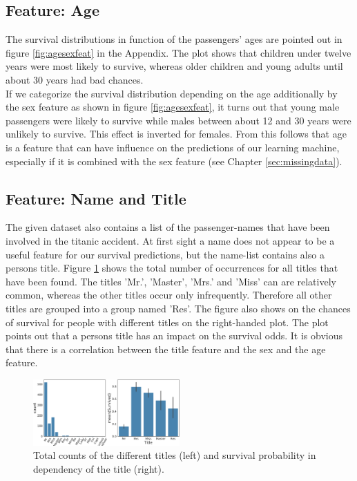 \subsection*{Feature: Age}
The survival distributions in function of the passengers' ages are pointed out in figure \ref{fig:agesexfeat} in the Appendix. The plot shows that children under twelve years were most likely to survive, whereas older children and young adults until about 30 years had bad chances.\\ 
If we categorize the survival distribution depending on the age additionally by the sex feature as shown in figure \ref{fig:agesexfeat}, it turns out that young male passengers were likely to survive while males between about 12 and 30 years were unlikely to survive. This effect is inverted for females. From this follows that age is a feature that can have influence on the predictions of our learning machine, especially if it is combined with the sex feature (see Chapter \ref{sec:missingdata}).


 
 \subsection*{Feature: Name and Title}
The given dataset also contains a list of the passenger-names that have been involved in the titanic accident. At first sight a name does not appear to be a useful feature for our survival predictions, but the name-list contains also a persons title. Figure \ref{fig:title} shows the total number of occurrences for all titles that have been found. The titles 'Mr.', 'Master', 'Mrs.' and 'Miss' can are relatively common, whereas the other titles occur only infrequently. Therefore all other titles are grouped into a group named 'Res'. The figure also shows on the chances of survival for people with different titles on the right-handed plot. The plot points out that a persons title has an impact on the survival odds. It is obvious that there is a correlation between the title feature and the sex and the age feature.

 \begin{figure}
 \centering
     \includegraphics[width=0.5\textwidth]{media_saved/title}
     \caption{Total counts of the different titles (left) and survival probability in dependency of the title (right).}
     \label{fig:title}
 \end{figure}
 

